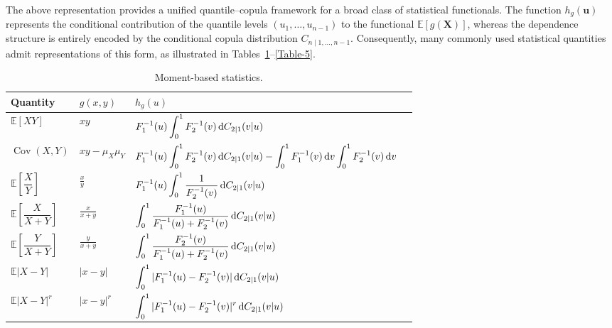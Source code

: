 \documentclass[12pt]{article}
\begin{document}
The above representation provides a unified quantile--copula framework for a broad class of statistical functionals. The function $h_g(\boldsymbol u)$ represents the conditional contribution of the quantile levels $(u_1,\ldots,u_{n-1})$ to the functional $\mathbb E[g(\boldsymbol X)]$, whereas the dependence structure is entirely encoded by the conditional copula distribution $C_{n\mid1,\ldots,n-1}$. Consequently, many commonly used statistical quantities admit representations of this form, as illustrated in Tables~\ref{Table-1}--\ref{Table-5}.
%
\begin{table}[H]
\centering
\caption{Moment-based statistics.}
\renewcommand{\arraystretch}{1.25}
\begin{tabular}{llll}
\hline
Quantity & $g(x,y)$ & $h_g(u)$\\
\hline

$\mathbb E[XY]$
&
$xy$
&
$\displaystyle
F_1^{-1}(u)
\int_0^1
F_2^{-1}(v)
\,{\rm d}C_{2|1}(v|u)
$
\\[3mm]

$\operatorname{Cov}(X,Y)$
&
$\displaystyle xy-\mu_X \mu_Y$
&
$\displaystyle
F_1^{-1}(u)
\int_0^1
F_2^{-1}(v)
\,{\rm d}C_{2|1}(v|u)
-
\int_0^1F_1^{-1}(v)\,{\rm d}v
\int_0^1F_2^{-1}(v)\,{\rm d}v
$
\\[3mm]

$\mathbb E\left[\dfrac{X}{Y}\right]$
&
$\displaystyle \frac{x}{y}$
&
$\displaystyle
F_1^{-1}(u)
\int_0^1
\frac{1}{F_2^{-1}(v)}
\,{\rm d}C_{2|1}(v|u)
$
\\[3mm]

$\mathbb E\!\left[\dfrac{X}{X+Y}\right]$
&
$\displaystyle \frac{x}{x+y}$
&
$\displaystyle
\int_0^1
\frac{F_1^{-1}(u)}
     {F_1^{-1}(u)+F_2^{-1}(v)}
\,{\rm d}C_{2|1}(v|u)
$
\\[3mm]

$\mathbb E\!\left[\dfrac{Y}{X+Y}\right]$
&
$\displaystyle \frac{y}{x+y}$
&
$\displaystyle
\int_0^1
\frac{F_2^{-1}(v)}
     {F_1^{-1}(u)+F_2^{-1}(v)}
\,{\rm d}C_{2|1}(v|u)
$
\\[3mm]

$\mathbb E|X-Y|$
&
$|x-y|$
&
$\displaystyle
\int_0^1
|F_1^{-1}(u)-F_2^{-1}(v)|
\,{\rm d}C_{2|1}(v|u)
$
\\[3mm]

$\mathbb E|X-Y|^r$
&
$|x-y|^r$
&
$\displaystyle
\int_0^1
|F_1^{-1}(u)-F_2^{-1}(v)|^r
\,{\rm d}C_{2|1}(v|u)
$
\\[3mm]

\hline
\end{tabular}
\label{Table-1}
\end{table}
\end{document}
